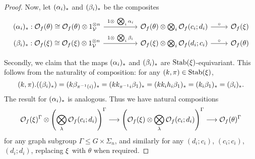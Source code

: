 \documentclass[a4paper,10pt
]{article}%
\renewcommand{\1}{\ensuremath{\mathbb{id}}}
\begin{document}
\begin{proof}
      Now, let $(\alpha_i)_{\**}$ and $(\beta_i)_{\**}$ be the composites
      \begin{equation}
            \begin{tikzcd}[row sep = tiny]
                  (\alpha_i)_{\**} : 
                  \O_f(\theta)
                  \cong
                  \O_f(\theta) \otimes 1_\V^{\otimes n} \arrow[rr, "1 \otimes\ \bigotimes_i \alpha_i"]
                  &&
                  \O_f(\theta) \otimes \bigotimes_i \O_f(c_i;d_i) \arrow[r,"\circ"]
                  &
                  \O_f(\ksi)
                  \\
                  (\beta_i)_{\**} :
                  \O_f(\ksi)
                  \cong
                  \O_f(\ksi) \otimes 1_\V^{\otimes n} \arrow[rr, "1 \otimes\ \bigotimes_i \beta_i"]
                  &&
                  \O_f(\ksi) \otimes \bigotimes_i \O_f(d_i;c_i) \arrow[r,"\circ"]
                  &
                  \O_f(\theta)
            \end{tikzcd}
      \end{equation}

      Secondly, we claim that the maps $(\alpha_i)_{\**}$ and $(\beta_i)_{\**}$ are $\mathrm{Stab}(\xi)$-equivariant.
      This follows from the naturality of composition: for any $(k,\pi) \in \mathrm{Stab}(\xi)$,
      \begin{equation}
            \label{AB_STAR_EQ}
            (k, \pi) . ((\beta_i)_{\**})
            =
            (k \beta_{\pi^{-1}(i)})_{\**}
            =
            (k k_{\pi^{-1}i} \beta_1)_{\**}
            =
            (k k_i h_i \beta_1)_{\**}
            =
            (k_i \beta_1)_{\**}
            =
            (\beta_i)_{\**}.
      \end{equation}
      The result for $(\alpha_i)_{\**}$ is analogous.      
      Thus we have natural compositions
      \begin{equation}
            \mathcal{O}_f(\xi)^{\Gamma} \otimes \left(
                  \bigotimes\limits_\lambda \mathcal{O}_f(c_i;d_i)
            \right)^{\Gamma}
            \longrightarrow
            \left(
                  \mathcal{O}_f(\xi) \otimes \bigotimes\limits_\lambda \mathcal{O}_f(c_i;d_i)
            \right)^\Gamma
            \longrightarrow
            \mathcal{O}_f(\theta)^\Gamma
      \end{equation}
      for any graph subgroup $\Gamma \leq G \times \Sigma_n$,
      and similarly for any $(d_i;c_i)$, $(c_i;c_i)$, $(d_i;d_i)$,
      replacing $\xi$ with $\theta$ when required.


\end{proof}
\end{document}
